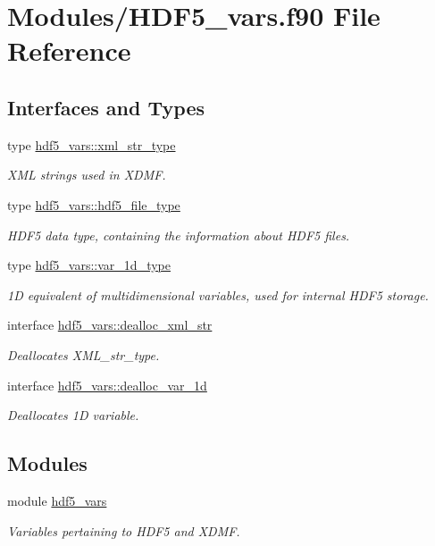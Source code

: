 \hypertarget{HDF5__vars_8f90}{}\section{Modules/\+H\+D\+F5\+\_\+vars.f90 File Reference}
\label{HDF5__vars_8f90}
\subsection*{Interfaces and Types}
\begin{DoxyCompactItemize}
\item 
type \hyperlink{structhdf5__vars_1_1xml__str__type}{hdf5\+\_\+vars\+::xml\+\_\+str\+\_\+type}
\begin{DoxyCompactList}\small\item\em X\+ML strings used in X\+D\+MF. \end{DoxyCompactList}\item 
type \hyperlink{structhdf5__vars_1_1hdf5__file__type}{hdf5\+\_\+vars\+::hdf5\+\_\+file\+\_\+type}
\begin{DoxyCompactList}\small\item\em H\+D\+F5 data type, containing the information about H\+D\+F5 files. \end{DoxyCompactList}\item 
type \hyperlink{structhdf5__vars_1_1var__1d__type}{hdf5\+\_\+vars\+::var\+\_\+1d\+\_\+type}
\begin{DoxyCompactList}\small\item\em 1D equivalent of multidimensional variables, used for internal H\+D\+F5 storage. \end{DoxyCompactList}\item 
interface \hyperlink{interfacehdf5__vars_1_1dealloc__xml__str}{hdf5\+\_\+vars\+::dealloc\+\_\+xml\+\_\+str}
\begin{DoxyCompactList}\small\item\em Deallocates X\+M\+L\+\_\+str\+\_\+type. \end{DoxyCompactList}\item 
interface \hyperlink{interfacehdf5__vars_1_1dealloc__var__1d}{hdf5\+\_\+vars\+::dealloc\+\_\+var\+\_\+1d}
\begin{DoxyCompactList}\small\item\em Deallocates 1D variable. \end{DoxyCompactList}\end{DoxyCompactItemize}
\subsection*{Modules}
\begin{DoxyCompactItemize}
\item 
module \hyperlink{namespacehdf5__vars}{hdf5\+\_\+vars}
\begin{DoxyCompactList}\small\item\em Variables pertaining to H\+D\+F5 and X\+D\+MF. \end{DoxyCompactList}\end{DoxyCompactItemize}
